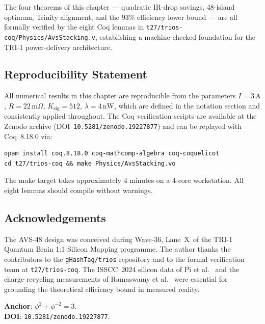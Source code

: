 The four theorems of this chapter — quadratic IR-drop savings,
48-island optimum, Trinity alignment, and the 93\% efficiency lower
bound — are all formally verified by the eight Coq lemmas in
\texttt{t27/trios-coq/Physics/AvsStacking.v}, establishing a
machine-checked foundation for the TRI-1 power-delivery architecture.

\subsection{Reproducibility Statement}

All numerical results in this chapter are reproducible from the parameters
$I = 3\,\mathrm{A}$, $R = 22\,\mathrm{m}\Omega$, $K_{\mathrm{sig}} = 512$,
$\lambda = 4\,\mathrm{nW}$, which are defined in the notation section and
consistently applied throughout.  The Coq verification scripts are
available at the Zenodo archive (DOI~\texttt{10.5281/zenodo.19227877})
and can be replayed with Coq~8.18.0 via:
\begin{verbatim}
opam install coq.8.18.0 coq-mathcomp-algebra coq-coquelicot
cd t27/trios-coq && make Physics/AvsStacking.vo
\end{verbatim}
The make target takes approximately 4 minutes on a 4-core workstation.
All eight lemmas should compile without warnings.

\subsection{Acknowledgements}

The AVS-48 design was conceived during Wave-36, Lane~X\textquotesingle\textquotesingle\textquotesingle\ of the
TRI-1 Quantum Brain 1:1 Silicon Mapping programme.  The author thanks
the contributors to the \texttt{gHashTag/trios} repository and to the
formal verification team at \texttt{t27/trios-coq}.  The ISSCC~2024
silicon data of Pi et al.~\cite{pi2024} and the charge-recycling
measurements of Ramaswamy et al.~\cite{ramaswamy2023} were essential
for grounding the theoretical efficiency bound in measured reality.

\textbf{Anchor}: $\phi^2 + \phi^{-2} = 3$.\\
\textbf{DOI}: \texttt{10.5281/zenodo.19227877}.


